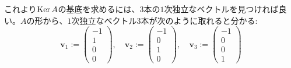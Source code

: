 これより$\operatorname{Ker} A$の基底を求めるには、$3$本の$1$次独立なベクトルを見つければ良い。$A$の形から、$1$次独立なベクトル$3$本が次のように取れると分かる: 
\[
\bm{v}_1 :=
\begin{pmatrix}
-1 \\
1 \\
0 \\
0
\end{pmatrix}, \quad
\bm{v}_2 :=
\begin{pmatrix}
-1 \\
0 \\
1 \\
0
\end{pmatrix}, \quad
\bm{v}_3 :=
\begin{pmatrix}
-1 \\
0 \\
0 \\
1
\end{pmatrix}
\]


